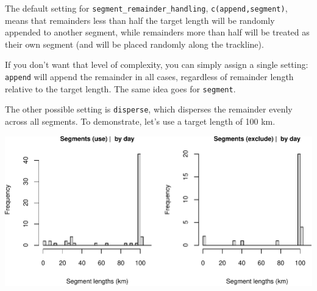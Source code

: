 \documentclass[
]{book}
\newenvironment{Shaded}{\begin{snugshade}}{\end{snugshade}}
\newcommand{\CommentTok}[1]{\textcolor[rgb]{0.56,0.35,0.01}{\textit{#1}}}
\newcommand{\DataTypeTok}[1]{\textcolor[rgb]{0.13,0.29,0.53}{#1}}
\newcommand{\DecValTok}[1]{\textcolor[rgb]{0.00,0.00,0.81}{#1}}
\newcommand{\KeywordTok}[1]{\textcolor[rgb]{0.13,0.29,0.53}{\textbf{#1}}}
\newcommand{\NormalTok}[1]{#1}
\newcommand{\OperatorTok}[1]{\textcolor[rgb]{0.81,0.36,0.00}{\textbf{#1}}}
\newcommand{\OtherTok}[1]{\textcolor[rgb]{0.56,0.35,0.01}{#1}}
\newcommand{\StringTok}[1]{\textcolor[rgb]{0.31,0.60,0.02}{#1}}
\begin{document}
The default setting for \texttt{segment\_remainder\_handling}, \texttt{c(\textquotesingle{}append\textquotesingle{},\textquotesingle{}segment\textquotesingle{})}, means that remainders less than half the target length will be randomly appended to another segment, while remainders more than half will be treated as their own segment (and will be placed randomly along the trackline).

If you don't want that level of complexity, you can simply assign a single setting: \texttt{\textquotesingle{}append\textquotesingle{}} will append the remainder in all cases, regardless of remainder length relative to the target length. The same idea goes for \texttt{\textquotesingle{}segment\textquotesingle{}}.

The other possible setting is \texttt{\textquotesingle{}disperse\textquotesingle{}}, which disperses the remainder evenly across all segments. To demonstrate, let's use a target length of 100 km.

\begin{Shaded}
\end{Shaded}

\includegraphics{figures/unnamed-chunk-458-1.pdf}
\end{document}
